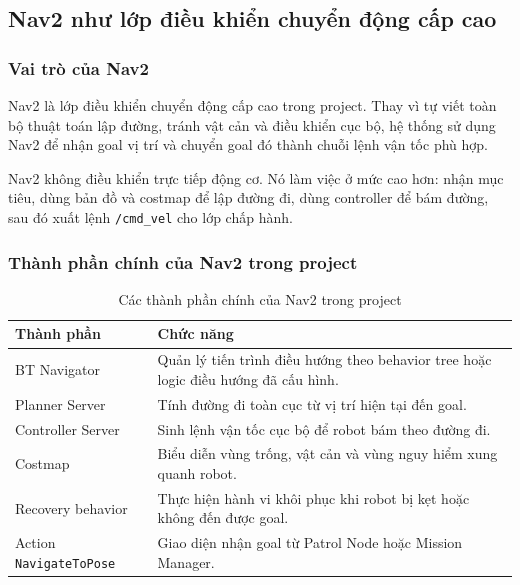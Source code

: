 \subsection{Nav2 như lớp điều khiển chuyển động cấp cao}
\label{subsec:nav2-high-level-control}

\subsubsection{Vai trò của Nav2}
\label{subsubsec:nav2-role}

Nav2 là lớp điều khiển chuyển động cấp cao trong project. Thay vì tự viết toàn bộ thuật toán lập đường, tránh vật cản và điều khiển cục bộ, hệ thống sử dụng Nav2 để nhận goal vị trí và chuyển goal đó thành chuỗi lệnh vận tốc phù hợp.

Nav2 không điều khiển trực tiếp động cơ. Nó làm việc ở mức cao hơn: nhận mục tiêu, dùng bản đồ và costmap để lập đường đi, dùng controller để bám đường, sau đó xuất lệnh \texttt{/cmd\_vel} cho lớp chấp hành.

\subsubsection{Thành phần chính của Nav2 trong project}
\label{subsubsec:nav2-components}

\begin{table}[H]
    \centering
    \caption{Các thành phần chính của Nav2 trong project}
    \label{tab:nav2-components}
    \renewcommand{\arraystretch}{1.25}
    \small
    \begin{tabularx}{\textwidth}{|>{\raggedright\arraybackslash}p{}|>{\raggedright\arraybackslash}X|}
        \hline
        \textbf{Thành phần} & \textbf{Chức năng} \\
        \hline
        BT Navigator & Quản lý tiến trình điều hướng theo behavior tree hoặc logic điều hướng đã cấu hình. \\
        \hline
        Planner Server & Tính đường đi toàn cục từ vị trí hiện tại đến goal. \\
        \hline
        Controller Server & Sinh lệnh vận tốc cục bộ để robot bám theo đường đi. \\
        \hline
        Costmap & Biểu diễn vùng trống, vật cản và vùng nguy hiểm xung quanh robot. \\
        \hline
        Recovery behavior & Thực hiện hành vi khôi phục khi robot bị kẹt hoặc không đến được goal. \\
        \hline
        Action \texttt{NavigateToPose} & Giao diện nhận goal từ Patrol Node hoặc Mission Manager. \\
        \hline
    \end{tabularx}
\end{table}

